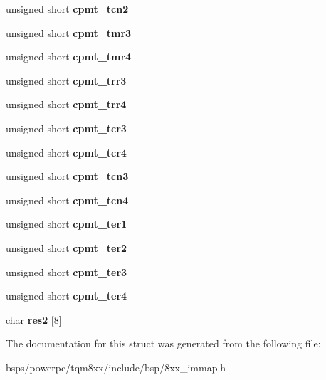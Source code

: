 \begin{DoxyCompactItemize}
unsigned short {\bfseries cpmt\+\_\+tcn2}
\item 
\mbox{\label{structcpm__timers_a4f6e85354fef005658698d1eacb53bf0}} 
unsigned short {\bfseries cpmt\+\_\+tmr3}
\item 
\mbox{\label{structcpm__timers_a412b1184f6db0a9bcd28192f73ac5a45}} 
unsigned short {\bfseries cpmt\+\_\+tmr4}
\item 
\mbox{\label{structcpm__timers_a4f1cd5c47ff2bde386673289b0f661f4}} 
unsigned short {\bfseries cpmt\+\_\+trr3}
\item 
\mbox{\label{structcpm__timers_a209dcc324bbe81e4d2377f94805e483b}} 
unsigned short {\bfseries cpmt\+\_\+trr4}
\item 
\mbox{\label{structcpm__timers_a078932b417d4ed3179f4f50e45e4a8e4}} 
unsigned short {\bfseries cpmt\+\_\+tcr3}
\item 
\mbox{\label{structcpm__timers_af8d26cad18ffdd07fc6334df9c06cd94}} 
unsigned short {\bfseries cpmt\+\_\+tcr4}
\item 
\mbox{\label{structcpm__timers_a8470e5ee62e43d11980a062f78d56d14}} 
unsigned short {\bfseries cpmt\+\_\+tcn3}
\item 
\mbox{\label{structcpm__timers_ab334ed2005b9ed83e909f9046638e074}} 
unsigned short {\bfseries cpmt\+\_\+tcn4}
\item 
\mbox{\label{structcpm__timers_af2659133d8c73fbb881b30e00a6db3eb}} 
unsigned short {\bfseries cpmt\+\_\+ter1}
\item 
\mbox{\label{structcpm__timers_a478c20addf5cfd065a9c43f2022ea4bd}} 
unsigned short {\bfseries cpmt\+\_\+ter2}
\item 
\mbox{\label{structcpm__timers_a1dc7d041ecd4baf235a3b5ed7468274e}} 
unsigned short {\bfseries cpmt\+\_\+ter3}
\item 
\mbox{\label{structcpm__timers_adbbe139306452756dc8c2f45988fd00b}} 
unsigned short {\bfseries cpmt\+\_\+ter4}
\item 
\mbox{\label{structcpm__timers_a8b728e705bd07872d36a0dcfd9ff408e}} 
char {\bfseries res2} \mbox{[}8\mbox{]}
\end{DoxyCompactItemize}


The documentation for this struct was generated from the following file\+:\begin{DoxyCompactItemize}
\item 
bsps/powerpc/tqm8xx/include/bsp/8xx\+\_\+immap.\+h\end{DoxyCompactItemize}
